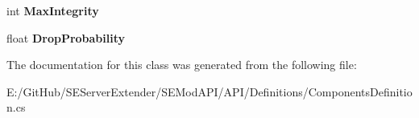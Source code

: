 \begin{DoxyCompactItemize}
\item 
\hypertarget{class_s_e_mod_a_p_i_1_1_a_p_i_1_1_definitions_1_1_components_definition_a03a8fdeb95081f4a5d6e1947a9bdfbe3}{}int {\bfseries Max\+Integrity}\label{class_s_e_mod_a_p_i_1_1_a_p_i_1_1_definitions_1_1_components_definition_a03a8fdeb95081f4a5d6e1947a9bdfbe3}

\item 
\hypertarget{class_s_e_mod_a_p_i_1_1_a_p_i_1_1_definitions_1_1_components_definition_a0aad4315b2dcb72eb69e3fbc68b0a645}{}float {\bfseries Drop\+Probability}\label{class_s_e_mod_a_p_i_1_1_a_p_i_1_1_definitions_1_1_components_definition_a0aad4315b2dcb72eb69e3fbc68b0a645}

\end{DoxyCompactItemize}


The documentation for this class was generated from the following file\+:\begin{DoxyCompactItemize}
\item 
E\+:/\+Git\+Hub/\+S\+E\+Server\+Extender/\+S\+E\+Mod\+A\+P\+I/\+A\+P\+I/\+Definitions/Components\+Definition.\+cs\end{DoxyCompactItemize}

